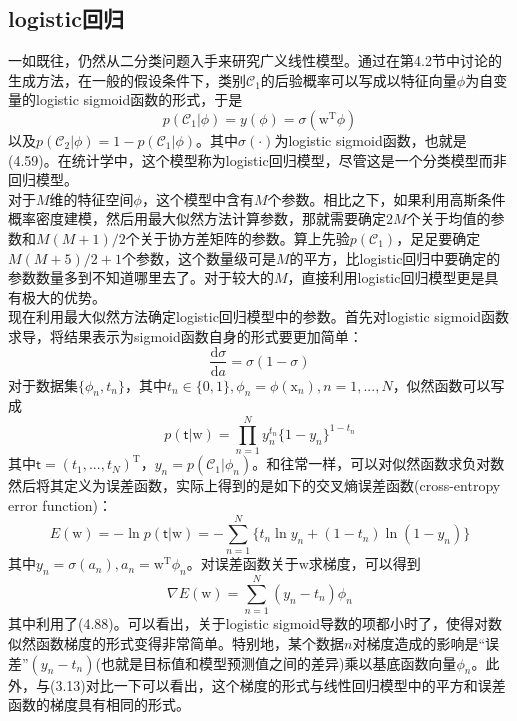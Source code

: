 \documentclass[b5paper]{book}
\numberwithin{equation}{chapter}
\newcommand {\bx} {\boldsymbol{\mathrm{x}}}
\newcommand {\bw} {\boldsymbol{\mathrm{w}}}
\newcommand {\sft} {\boldsymbol{\mathsf{t}}}
\newcommand {\rmT} {\mathrm{T}}
\newcommand {\rmd} {\mathrm{d}}
\newcommand {\calC} {\mathcal{C}}
\begin{document}
	\subsection{logistic回归}
	\textnormal{一如既往，仍然从二分类问题入手来研究广义线性模型。通过在第4.2节中讨论的生成方法，在一般的假设条件下，类别$\calC_1$的后验概率可以写成以特征向量$\phi$为自变量的logistic sigmoid函数的形式，于是
	\begin{equation}
		p(\calC_1|\phi) = y(\phi) = \sigma(\bw^{\rmT}\phi)
	\end{equation}
	以及$p(\calC_2|\phi) = 1 - p(\calC_1|\phi)$。其中$\sigma(\cdot)$为logistic sigmoid函数，也就是(4.59)。在统计学中，这个模型称为logistic回归模型，尽管这是一个分类模型而非回归模型。\\
	\indent 对于$M$维的特征空间$\phi$，这个模型中含有$M$个参数。相比之下，如果利用高斯条件概率密度建模，然后用最大似然方法计算参数，那就需要确定$2M$个关于均值的参数和$M(M+1)/2$个关于协方差矩阵的参数。算上先验$p(\calC_1)$，足足要确定$M(M+5)/2+1$个参数，这个数量级可是$M$的平方，比logistic回归中要确定的参数数量多到不知道哪里去了。对于较大的$M$，直接利用logistic回归模型更是具有极大的优势。\\
	\indent 现在利用最大似然方法确定logistic回归模型中的参数。首先对logistic sigmoid函数求导，将结果表示为sigmoid函数自身的形式要更加简单：
	\begin{equation}
		\frac{\rmd \sigma}{\rmd a} = \sigma(1-\sigma)
	\end{equation}
	对于数据集$\{\phi_n, t_n\}$，其中$t_n \in \{0,1\}, \phi_n = \phi(\bx_n), n=1,...,N$，似然函数可以写成
	\begin{equation}
		p(\sft|\bw) = \prod_{n=1}^N y_n^{t_n} \{1-y_n\}^{1-t_n}
	\end{equation}
	其中$\sft = (t_1, ..., t_N)^{\rmT}$，$y_n = p(\calC_1|\phi_n)$。和往常一样，可以对似然函数求负对数然后将其定义为误差函数，实际上得到的是如下的交叉熵误差函数(cross-entropy error function)：
	\begin{equation}
		E(\bw) = -\ln p(\sft|\bw) = -\sum_{n=1}^N \{t_n \ln y_n + (1-t_n)\ln (1-y_n)\}
	\end{equation}
	其中$y_n = \sigma(a_n), a_n = \bw^{\rmT}\phi_n$。对误差函数关于$\bw$求梯度，可以得到
	\begin{equation}
		\nabla E(\bw) = \sum_{n=1}^N (y_n - t_n)\phi_n
	\end{equation}
	其中利用了(4.88)。可以看出，关于logistic sigmoid导数的项都小时了，使得对数似然函数梯度的形式变得非常简单。特别地，某个数据$n$对梯度造成的影响是“误差”$(y_n - t_n)$(也就是目标值和模型预测值之间的差异)乘以基底函数向量$\phi_n$。此外，与(3.13)对比一下可以看出，这个梯度的形式与线性回归模型中的平方和误差函数的梯度具有相同的形式。\\
}
\end{document}
